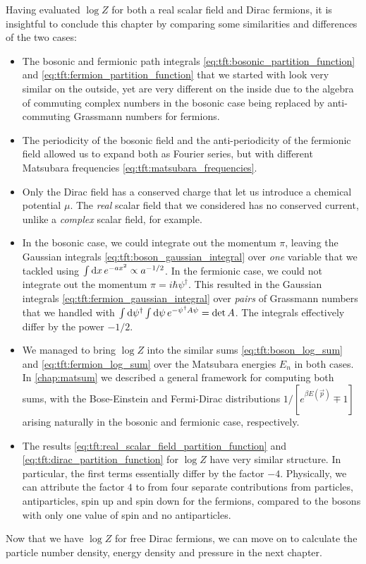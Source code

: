 Having evaluated $\log Z$ for both a real scalar field and Dirac fermions, it is insightful to conclude this chapter by comparing some similarities and differences of the two cases:
\begin{itemize}
\item The bosonic and fermionic path integrals \eqref{eq:tft:bosonic_partition_function} and \eqref{eq:tft:fermion_partition_function} that we started with look very similar on the outside, yet are very different on the inside due to the algebra of commuting complex numbers in the bosonic case being replaced by anti-commuting Grassmann numbers for fermions.
\item The periodicity of the bosonic field and the anti-periodicity of the fermionic field allowed us to expand both as Fourier series, but with different Matsubara frequencies \eqref{eq:tft:matsubara_frequencies}.
\item Only the Dirac field has a conserved charge that let us introduce a chemical potential $\mu$.
      The \emph{real} scalar field that we considered has no conserved current, unlike a \emph{complex} scalar field, for example.
\item In the bosonic case, we could integrate out the momentum $\pi$, leaving the Gaussian integrals \eqref{eq:tft:boson_gaussian_integral} over \emph{one} variable that we tackled using $\int \mathop{}\!\mathrm{d} x \, e^{-ax^2} \propto a^{-1/2}$.
      In the fermionic case, we could not integrate out the momentum $\pi = i \hbar \psi^\dagger$.
      This resulted in the Gaussian integrals \eqref{eq:tft:fermion_gaussian_integral} over \emph{pairs} of Grassmann numbers that we handled with $\int \mathop{}\!\mathrm{d} \psi^\dagger \int \mathop{}\!\mathrm{d} \psi \, e^{-\psi^\dagger A \psi} = \operatorname{det} A$.
	  The integrals effectively differ by the power $-1/2$.
\item We managed to bring $\log Z$ into the similar sums \eqref{eq:tft:boson_log_sum} and \eqref{eq:tft:fermion_log_sum} over the Matsubara energies $E_n$ in both cases.
      In \cref{chap:matsum} we described a general framework for computing both sums, with the Bose-Einstein and Fermi-Dirac distributions $1 / [e^{\beta E(\vec{p})} \mp 1]$ arising naturally in the bosonic and fermionic case, respectively.
\item The results \eqref{eq:tft:real_scalar_field_partition_function} and \eqref{eq:tft:dirac_partition_function} for $\log Z$ have very similar structure.
      In particular, the first terms essentially differ by the factor $-4$.
      Physically, we can attribute the factor $4$ to from four separate contributions from particles, antiparticles, spin up and spin down for the fermions, compared to the bosons with only one value of spin and no antiparticles.
\end{itemize}
Now that we have $\log Z$ for free Dirac fermions, we can move on to calculate the particle number density, energy density and pressure in the next chapter.
